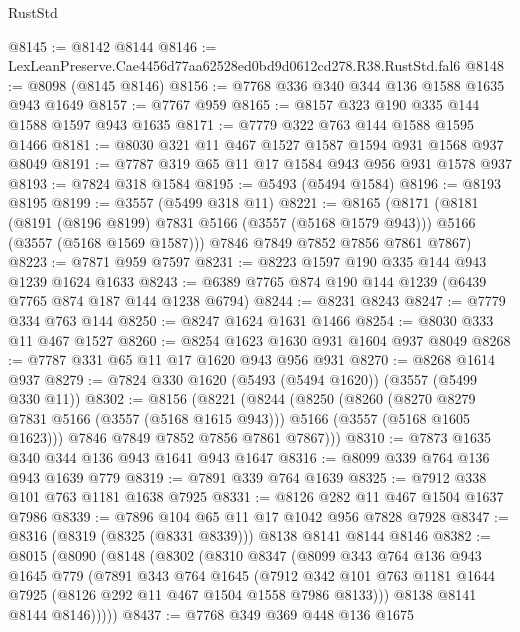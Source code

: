 \begin{lexlean}{RustStd}
\begin{coremodule}
@8145 := @8142 @8144
@8146 := LexLeanPreserve.Cae4456d77aa62528ed0bd9d0612cd278.R38.RustStd.fal6
@8148 := @8098 (@8145 @8146)
@8156 := @7768 @336 @340 @344 @136 @1588 @1635 @943 @1649
@8157 := @7767 @959
@8165 := @8157 @323 @190 @335 @144 @1588 @1597 @943 @1635
@8171 := @7779 @322 @763 @144 @1588 @1595 @1466
@8181 := @8030 @321 @11 @467 @1527 @1587 @1594 @931 @1568 @937 @8049
@8191 := @7787 @319 @65 @11 @17 @1584 @943 @956 @931 @1578 @937
@8193 := @7824 @318 @1584
@8195 := @5493 (@5494 @1584)
@8196 := @8193 @8195
@8199 := @3557 (@5499 @318 @11)
@8221 := @8165
    (@8171
      (@8181
        (@8191 (@8196 @8199) @7831 @5166 (@3557 (@5168 @1579 @943)))
        @5166
        (@3557 (@5168 @1569 @1587)))
      @7846
      @7849
      @7852
      @7856
      @7861
      @7867)
@8223 := @7871 @959 @7597
@8231 := @8223 @1597 @190 @335 @144 @943 @1239 @1624 @1633
@8243 := @6389 @7765 @874 @190 @144 @1239 (@6439 @7765 @874 @187 @144 @1238 @6794)
@8244 := @8231 @8243
@8247 := @7779 @334 @763 @144
@8250 := @8247 @1624 @1631 @1466
@8254 := @8030 @333 @11 @467 @1527
@8260 := @8254 @1623 @1630 @931 @1604 @937 @8049
@8268 := @7787 @331 @65 @11 @17 @1620 @943 @956 @931
@8270 := @8268 @1614 @937
@8279 := @7824 @330 @1620 (@5493 (@5494 @1620)) (@3557 (@5499 @330 @11))
@8302 := @8156
    (@8221
      (@8244
        (@8250
          (@8260
            (@8270 @8279 @7831 @5166 (@3557 (@5168 @1615 @943)))
            @5166
            (@3557 (@5168 @1605 @1623)))
          @7846
          @7849
          @7852
          @7856
          @7861
          @7867)))
@8310 := @7873 @1635 @340 @344 @136 @943 @1641 @943 @1647
@8316 := @8099 @339 @764 @136 @943 @1639 @779
@8319 := @7891 @339 @764 @1639
@8325 := @7912 @338 @101 @763 @1181 @1638 @7925
@8331 := @8126 @282 @11 @467 @1504 @1637 @7986
@8339 := @7896 @104 @65 @11 @17 @1042 @956 @7828 @7928
@8347 := @8316 (@8319 (@8325 (@8331 @8339))) @8138 @8141 @8144 @8146
@8382 := @8015
    (@8090
      (@8148
        (@8302
          (@8310
            @8347
            (@8099
              @343
              @764
              @136
              @943
              @1645
              @779
              (@7891
                @343
                @764
                @1645
                (@7912
                  @342
                  @101
                  @763
                  @1181
                  @1644
                  @7925
                  (@8126 @292 @11 @467 @1504 @1558 @7986 @8133)))
              @8138
              @8141
              @8144
              @8146)))))
@8437 := @7768
    @349
    @369
    @448
    @136
    @1675

\end{coremodule}
\end{lexlean}
